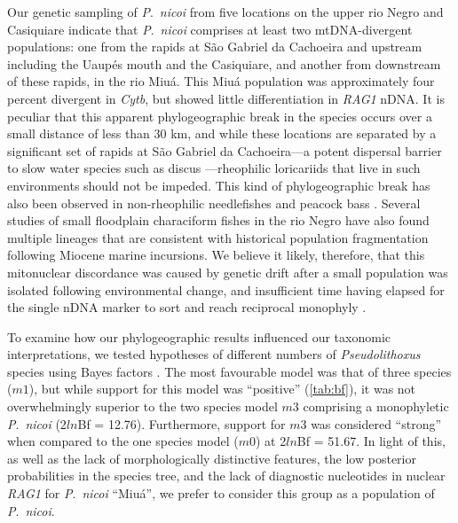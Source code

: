 \documentclass[12pt]{article}
\begin{document}
Our genetic sampling of \emph{P}.\ \emph{nicoi} from five locations on the upper rio Negro and Casiquiare indicate that \emph{P}.\ \emph{nicoi} comprises at least two mtDNA-divergent populations: one from the rapids at São Gabriel da Cachoeira and upstream including the Uaupés mouth and the Casiquiare, and another from downstream of these rapids, in the rio Miuá. %
This Miuá population was approximately four percent divergent in \emph{Cytb}, but showed little differentiation in \emph{RAG1} nDNA. %
It is peculiar that this apparent phylogeographic break in the species occurs over a small distance of less than 30 km, and while these locations are separated by a significant set of rapids at São Gabriel da Cachoeira---a potent dispersal barrier to slow water species such as discus \citep{Farias2008}---rheophilic loricariids that live in such environments should not be impeded. %
This kind of phylogeographic break has also been observed in non-rheophilic needlefishes \citep[\emph{Potamorrhaphis};][]{Lovejoy2000} and peacock bass \citep[\emph{Cichla};][]{Willis2007}. %
Several studies of small floodplain characiform fishes in the rio Negro \citep[e.g.][]{Cooke2009,Piggott2011,Schneider2012,Sistrom2009,Terencio2012} have also found multiple lineages that are consistent with historical population fragmentation following Miocene marine incursions. %
We believe it likely, therefore, that this mitonuclear discordance was caused by genetic drift after a small population was isolated following environmental change, and insufficient time having elapsed for the single nDNA marker to sort and reach reciprocal monophyly \citep{Edwards2009,Zink2008}.%

To examine how our phylogeographic results influenced our taxonomic interpretations, we tested hypotheses of different numbers of \emph{Pseudolithoxus} species using Bayes factors \citep[see][for interpretation of Bayes factors]{Kass1995}. %
The most favourable model was that of three species ($m1$), but while support for this model was ``positive'' (\autoref{tab:bf}), it was not overwhelmingly superior to the two species model $m3$ comprising a monophyletic \emph{P}.\ \emph{nicoi} (2$ln$Bf = 12.76). %
Furthermore, support for $m3$ was considered ``strong'' when compared to the one species model ($m0$) at 2$ln$Bf = 51.67. %
In light of this, as well as the lack of morphologically distinctive features, the low posterior probabilities in the species tree, and the lack of diagnostic nucleotides in nuclear \emph{RAG1} for \emph{P}.\ \emph{nicoi} ``Miuá'', we prefer to consider this group as a population of \emph{P}.\ \emph{nicoi}.%
\end{document}
